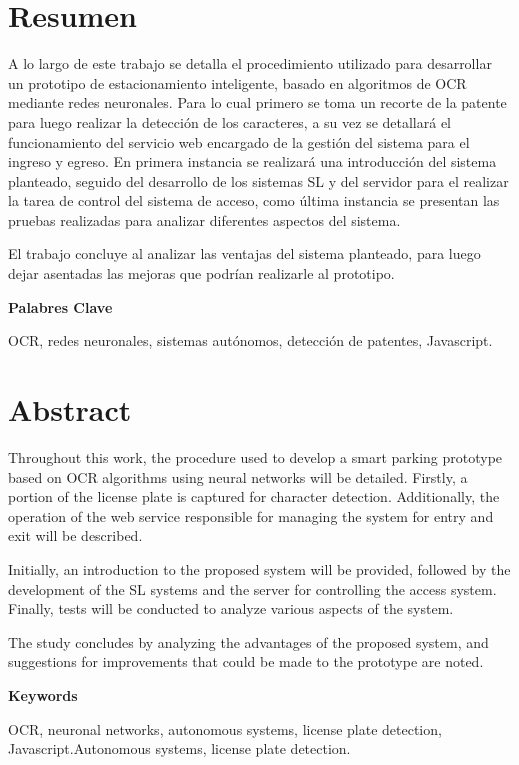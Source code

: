 \chapter*{Resumen}
A lo largo de este trabajo se detalla el procedimiento utilizado para desarrollar un prototipo de estacionamiento inteligente, basado en algoritmos de OCR mediante redes neuronales. Para lo cual primero se toma un recorte de la patente para luego realizar la detección de los caracteres, a su vez se detallará el funcionamiento del servicio web encargado de la gestión del sistema para el ingreso y egreso.
En primera instancia se realizará una introducción del sistema planteado, seguido del desarrollo de los sistemas SL y del servidor para el realizar la tarea de control del sistema de acceso, como última instancia se presentan las pruebas realizadas para analizar diferentes aspectos del sistema.

El trabajo concluye al analizar las ventajas del sistema planteado, para luego dejar asentadas las mejoras que podrían realizarle al prototipo.



\vspace*{\fill}
\noindent \textbf{Palabres Clave}

OCR, redes neuronales, sistemas autónomos, detección de patentes, Javascript.

\chapter*{Abstract}
Throughout this work, the procedure used to develop a smart parking prototype based on OCR algorithms using neural networks will be detailed. Firstly, a portion of the license plate is captured for character detection. Additionally, the operation of the web service responsible for managing the system for entry and exit will be described.

Initially, an introduction to the proposed system will be provided, followed by the development of the SL systems and the server for controlling the access system. Finally, tests will be conducted to analyze various aspects of the system.

The study concludes by analyzing the advantages of the proposed system, and suggestions for improvements that could be made to the prototype are noted.

\vspace*{\fill}
\noindent \textbf{Keywords}

OCR, neuronal networks, autonomous systems, license plate detection, Javascript.Autonomous systems, license plate detection.